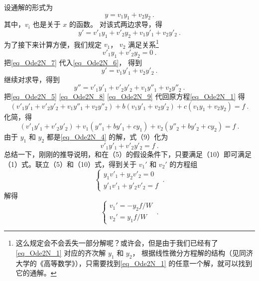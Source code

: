 设通解的形式为
\begin{equation}\label{eq_Ode2N_5}
y = v_1 y_1 + v_2 y_2~.
\end{equation}
其中，$v_i$ 也是关于 $x$ 的函数。 对该式两边求导，得
\begin{equation}\label{eq_Ode2N_6}
y' = v'_1 y_1 + v'_2 y_2 + v_1 y'_1 + v_2 y'_2~.
\end{equation}
为了接下来计算方便，我们规定 $v_1$， $v_2$ 满足关系\footnote{这么规定会不会丢失一部分解呢？或许会，但是由于我们已经有了\autoref{eq_Ode2N_1} 对应的齐次解 $y_1$ 和 $y_2$， 根据线性微分方程解的结构（见同济大学的《高等数学》），只需要找到\autoref{eq_Ode2N_1} 的任意一个解，就可以找到它的通解。}
\begin{equation}\label{eq_Ode2N_7}
v'_1 y_1 + v'_2 y_2 = 0~.
\end{equation}
把\autoref{eq_Ode2N_7} 代入\autoref{eq_Ode2N_6}， 得到
\begin{equation}\label{eq_Ode2N_8}
y' = v_1 y'_1 + v_2 y'_2~.
\end{equation}
继续对求导，得到
\begin{equation}\label{eq_Ode2N_9}
y'' = v'_1 y'_1 + v'_2 y'_2 + v_1 y''_1 + v_2 y''_2~.
\end{equation}
把\autoref{eq_Ode2N_5} \autoref{eq_Ode2N_8} \autoref{eq_Ode2N_9} 代回原方程\autoref{eq_Ode2N_1} 得
\begin{equation}
(v'_1 y'_1 + v'_2 y'_2 + v_1 y''_1 + v_2 y''_2) + b (v_1 y'_1 + v_2 y'_2) + c(v_1 y_1 + v_2 y_2) = f~.
\end{equation}
化简，得
\begin{equation}
(v'_1 y'_1 + v'_2 y'_2) + v_1 ( y''_1 + b y'_1 + c y_1) + v_2 ( y''_2 + b y'_2 + c y_2) = f ~.\end{equation}
由于 $y_1$ 和 $y_2$ 都是\autoref{eq_Ode2N_4} 的解，式（9）化为 %
\begin{equation} v'_1 y'_1 + v'_2 y'_2 = f~.
\end{equation}
总结一下，刚刚的推导说明，和在（5）的假设条件下，只要满足（10）即可满足（1）式。联立（5）和（10）式，得到关于 $v_1'$ 和 $v_2'$ 的方程组
\begin{equation}
\begin{cases}
y_1 v'_1 + y_2 v'_2 = 0\\
y'_1 v'_1 + y'_2 v'_2 = f
\end{cases}~.
\end{equation}
解得
\begin{equation}
\begin{cases}
v_1' = -y_2f/W\\
v_2' = y_1 f/W
\end{cases}~.
\end{equation}
